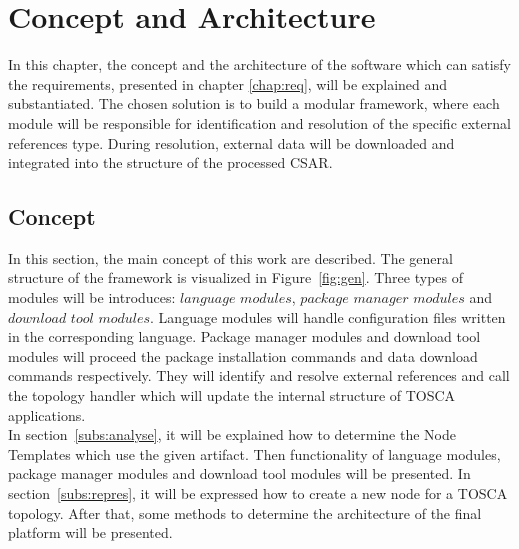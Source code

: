 
\chapter{Concept and Architecture}\label{chap:conarch}
In this chapter, the concept and the architecture of the software which can satisfy the requirements, presented in chapter \ref{chap:req}, will be explained and substantiated.
The chosen solution is to build a modular framework, where each module will be responsible for identification and resolution of the specific external references type.
During resolution, external data will be downloaded and integrated into the structure of the processed CSAR.
\section{Concept}
In this section, the main concept of this work are described.
The general structure of the framework is visualized in Figure~\ref{fig:gen}. 
Three types of modules will be introduces: $language$ $modules$, $package$ $manager$ $modules$ and $download$ $tool$ $modules$.
Language modules will handle configuration files written in the corresponding language.
Package manager modules and download tool modules will proceed the package installation commands and data download commands respectively.
They will identify and resolve external references and call the topology handler which will update the internal structure of TOSCA applications. \\
In section~\ref{subs:analyse}, it will be explained how to determine the Node Templates which use the given artifact.
Then functionality of language modules, package manager modules and download tool modules will be presented.
In section~\ref{subs:repres}, it will be expressed how to create a new node for a TOSCA topology. 
After that, some methods to determine the architecture of the final platform will be presented.


